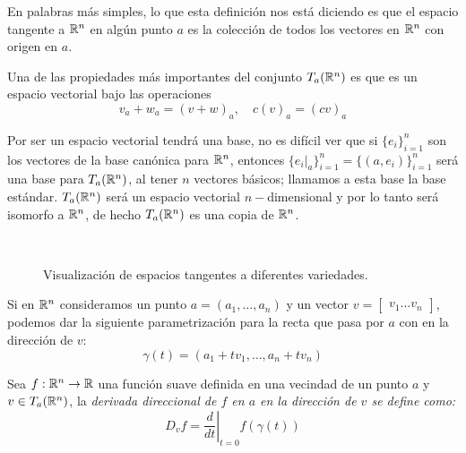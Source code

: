 En palabras más simples, lo que esta definición nos está diciendo es que el espacio tangente a $\mathbb{R}^n$ en algún punto $a$ es la colección de todos los vectores en $\mathbb{R}^n$ con origen en $a$.

Una de las propiedades más importantes del conjunto $T_a(\mathbb{R}^n)$ es que es un espacio vectorial bajo las operaciones
\[ v_a + w_a = (v + w)_a, \quad c(v)_a = (cv)_a \]

Por ser un espacio vectorial tendrá una base, no es difícil ver que si $\{e_i\}_{i=1}^n$ son los vectores de la base canónica para $\mathbb{R}^n$, entonces $\{e_i|_{a}\}_{i=1}^n = \{(a,e_i)\}_{i=1}^n$ será una base para $T_a(\mathbb{R}^n)$, al tener $n$ vectores básicos; llamamos a esta base la base estándar. $T_a(\mathbb{R}^n)$ será un espacio vectorial $n-$dimensional y por lo tanto será isomorfo a $\mathbb{R}^n$, de hecho $T_a(\mathbb{R}^n)$ es una copia de $\mathbb{R}^n$.

\begin{center}
\begin{figure}[h]
	\centering
	\begin{subfigure}{0.40\textwidth}
		\centering
    
	\end{subfigure}
	\begin{subfigure}{0.40\textwidth}
		\centering
    
	\end{subfigure}
  \\[20pt]
	\begin{subfigure}{0.40\textwidth}
		\centering
    
	\end{subfigure}
	\begin{subfigure}{0.40\textwidth}
		\centering
    
	\end{subfigure}
\caption{Visualización de espacios tangentes a diferentes variedades.}
\end{figure}
\end{center}

Si en $\mathbb{R}^n$ consideramos un punto $a = (a_1, \dots, a_n)$ y un vector $v = \begin{bmatrix} v_1 \dots v_n \end{bmatrix}$, podemos dar la siguiente parametrización para la recta que pasa por $a$ con en la dirección de $v$:
\[ \gamma(t) = (a_1 + tv_1, \dots, a_n + tv_n) \]





\begin{definition}\label{Definción: Derivada Direccional}
	Sea $f: \mathbb{R}^n \to \mathbb{R}$ una función suave definida en una vecindad de un punto $a$ y $v \in T_a(\mathbb{R}^n)$, la \it{derivada direccional} de $f$ en $a$ en la dirección de $v$ se define como:
	\[ D_v f = \left. \frac{d}{dt} \right|_{t=0} f(\gamma(t)) \]
\end{definition}

